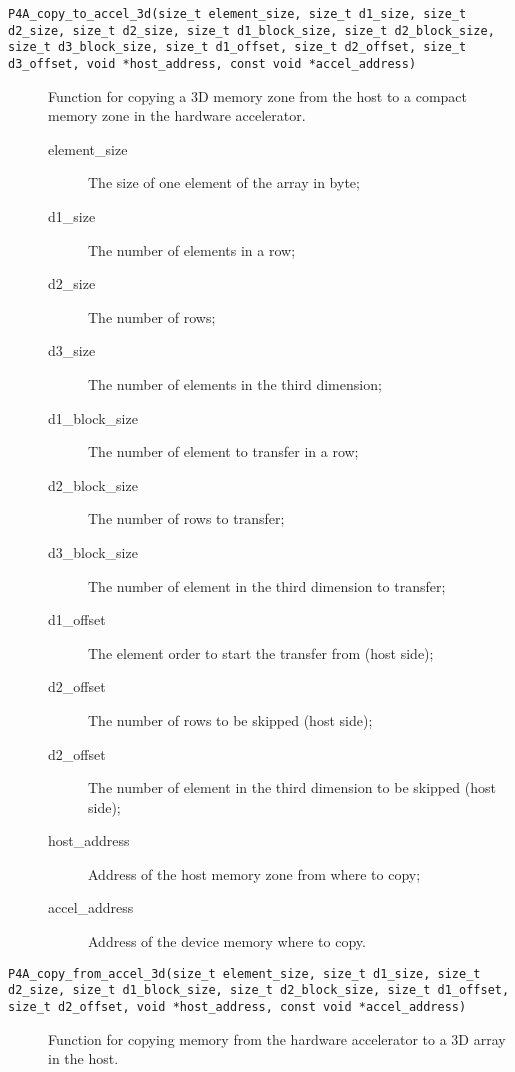 \documentclass[a4paper]{article}
\begin{document}
\begin{description}
\item[\texttt{P4A\_copy\_to\_accel\_3d(size\_t element\_size, size\_t
    d1\_size, size\_t d2\_size, size\_t d2\_size, size\_t
    d1\_block\_size, size\_t d2\_block\_size, size\_t d3\_block\_size,
    size\_t d1\_offset, size\_t d2\_offset, size\_t d3\_offset, void
    *host\_address, const void *accel\_address)}] Function for copying
  a 3D memory zone from the host to a compact memory zone in the
  hardware accelerator.

  \begin{description}
  \item[element\_size] The size of one element of the array in byte;
  \item[d1\_size] The number of elements in a row;
  \item[d2\_size] The number of rows;
  \item[d3\_size] The number of elements in the third dimension;
  \item[d1\_block\_size] The number of element to transfer in a row;
  \item[d2\_block\_size] The number of rows to transfer;
  \item[d3\_block\_size] The number of element in the third
    dimension to transfer;
  \item[d1\_offset] The element order to start the transfer from (host
    side);
  \item[d2\_offset] The number of rows to be skipped (host side);
  \item[d2\_offset] The number of element in the third dimension to
    be skipped (host side);
  \item[host\_address] Address of the host memory zone from where to copy;
  \item[accel\_address] Address of the device memory where to copy.
  \end{description}


\item[\texttt{P4A\_copy\_from\_accel\_3d(size\_t element\_size,
    size\_t d1\_size, size\_t d2\_size, size\_t d1\_block\_size,
    size\_t d2\_block\_size, size\_t d1\_offset, size\_t d2\_offset,
    void *host\_address, const void *accel\_address)}] Function for
  copying memory from the hardware accelerator to a 3D array in the
  host.


\end{description}
\end{document}

